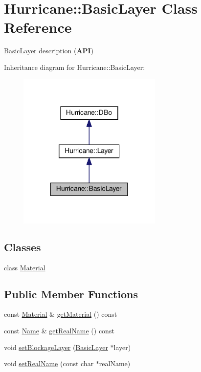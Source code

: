 \hypertarget{classHurricane_1_1BasicLayer}{}\section{Hurricane\+:\+:Basic\+Layer Class Reference}
\label{classHurricane_1_1BasicLayer}


\mbox{\hyperlink{classHurricane_1_1BasicLayer}{Basic\+Layer}} description ({\bfseries A\+PI})  




Inheritance diagram for Hurricane\+:\+:Basic\+Layer\+:\nopagebreak
\begin{figure}[H]
\begin{center}
\leavevmode
\includegraphics[width=202pt]{classHurricane_1_1BasicLayer__inherit__graph}
\end{center}
\end{figure}
\subsection*{Classes}
\begin{DoxyCompactItemize}
\item 
class \mbox{\hyperlink{classHurricane_1_1BasicLayer_1_1Material}{Material}}
\end{DoxyCompactItemize}
\subsection*{Public Member Functions}
\begin{DoxyCompactItemize}
\item 
const \mbox{\hyperlink{classHurricane_1_1BasicLayer_1_1Material}{Material}} \& \mbox{\hyperlink{classHurricane_1_1BasicLayer_aeb7fd37db4ecf8e56e1992d6350fac58}{get\+Material}} () const
\item 
const \mbox{\hyperlink{classHurricane_1_1Name}{Name}} \& \mbox{\hyperlink{classHurricane_1_1BasicLayer_aaae9fcd776eb83407b4566614eafc41f}{get\+Real\+Name}} () const
\item 
void \mbox{\hyperlink{classHurricane_1_1BasicLayer_a766c6dc1120de2066b15411861f5d4f8}{set\+Blockage\+Layer}} (\mbox{\hyperlink{classHurricane_1_1BasicLayer}{Basic\+Layer}} $\ast$layer)
\item 
void \mbox{\hyperlink{classHurricane_1_1BasicLayer_aa5aa1e1079c14d7e9c05799d14e726af}{set\+Real\+Name}} (const char $\ast$real\+Name)
\end{DoxyCompactItemize}
